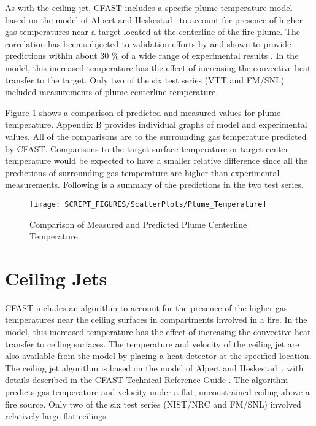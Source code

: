 As with the ceiling jet, CFAST includes a specific plume temperature model based on the model of Alpert and Heskestad~\cite{Alpert:SFPE} to account for presence of higher gas temperatures near a target located at the centerline of the fire plume. The correlation has been subjected to validation efforts by \cite{Valid:Davis_Plumes} and shown to provide predictions within about 30 \% of a wide range of experimental results \cite{Valid:Davis_Plumes}. In the model, this increased temperature has the effect of increasing the convective heat transfer to the target. Only two of the six test series (VTT and FM/SNL) included measurements of plume centerline temperature.

Figure \ref{fig:Plume_Temp_Scatter} shows a comparison of predicted and measured values for plume temperature. Appendix B provides individual graphs of model and experimental values. All of the comparisons are to the surrounding gas temperature predicted by CFAST. Comparisons to the target surface temperature or target center temperature would be expected to have a smaller relative difference since all the predictions of surrounding gas temperature are higher than experimental measurements. Following is a summary of the predictions in the two test series.
\label{Plume Temperature}

\begin{figure}
\begin{center}
\texttt{[image: SCRIPT\_FIGURES/ScatterPlots/Plume\_Temperature]}
\end{center}
\caption{Comparison of Measured and Predicted Plume Centerline Temperature.} \label{fig:Plume_Temp_Scatter}
\end{figure}


\section{Ceiling Jets}

CFAST includes an algorithm to account for the presence of the higher gas temperatures near the ceiling surfaces in compartments involved in a fire.  In the model, this increased temperature has the effect of increasing the convective heat transfer to ceiling surfaces.  The temperature and velocity of the ceiling jet are also available from the model by placing a heat detector at the specified location.  The ceiling jet algorithm is based on the model of Alpert and Heskestad~\cite{Alpert:SFPE}, with details described in the CFAST Technical Reference Guide \cite{CFAST_Tech_Guide_7}.  The algorithm predicts gas temperature and velocity under a flat, unconstrained ceiling above a fire source.  Only two of the six test series (NIST/NRC and FM/SNL) involved relatively large flat ceilings.

